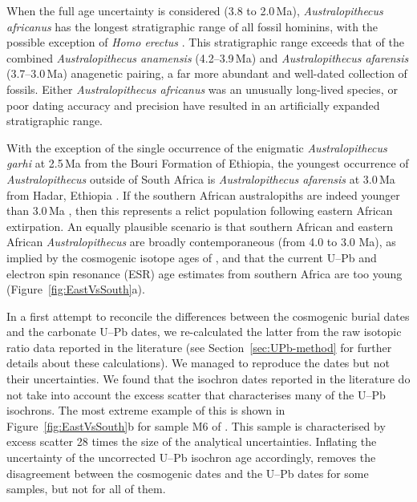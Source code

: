 \documentclass[11pt]{article}
\begin{document}
When the full age uncertainty is considered (3.8 to 2.0\,Ma),
\emph{Australopithecus africanus} has the longest stratigraphic range
of all fossil hominins, with the possible exception of \emph{Homo
erectus} \citep[e.g.][]{wood2016}. This stratigraphic range exceeds
that of the combined \emph{Australopithecus anamensis} (4.2--3.9\,Ma)
and \emph{Australopithecus afarensis} (3.7--3.0\,Ma) anagenetic
pairing, a far more abundant and well-dated collection of
fossils. Either \emph{Australopithecus africanus} was an unusually
long-lived species, or poor dating accuracy and precision have
resulted in an artificially expanded stratigraphic range.

With the exception of the single occurrence of the enigmatic
\emph{Australopithecus garhi} at 2.5\,Ma \citep{asfaw1999} from the
Bouri Formation of Ethiopia, the youngest occurrence of
\emph{Australopithecus} outside of South Africa is
\emph{Australopithecus afarensis} at 3.0\,Ma from Hadar, Ethiopia
\citep{alemseged2005}. If the southern African australopiths are
indeed younger than 3.0\,Ma \citep[as suggested by the most recent
  biostratigraphic inferences of][]{frost2022}, then this represents a
relict population following eastern African extirpation. An equally
plausible scenario is that southern African and eastern African
\emph{Australopithecus} are broadly contemporaneous (from 4.0 to 3.0
Ma), as implied by the cosmogenic isotope ages of \citet{granger2022},
and that the current U--Pb and electron spin resonance (ESR) age
estimates from southern Africa are too young
(Figure~\ref{fig:EastVsSouth}a).

In a first attempt to reconcile the differences between the cosmogenic
burial dates and the carbonate U--Pb dates, we re-calculated the
latter from the raw isotopic ratio data reported in the literature
(see Section~\ref{sec:UPb-method} for further details about these
calculations).  We managed to reproduce the dates but not their
uncertainties. We found that the isochron dates reported in the
literature do not take into account the excess scatter that
characterises many of the U--Pb isochrons. The most extreme example of
this is shown in Figure~\ref{fig:EastVsSouth}b for sample M6 of
\citep{pickering2019}.  This sample is characterised by excess scatter
28 times the size of the analytical uncertainties. Inflating the
uncertainty of the uncorrected U--Pb isochron age accordingly, removes
the disagreement between the cosmogenic dates and the U--Pb dates for
some samples, but not for all of them.
\end{document}
